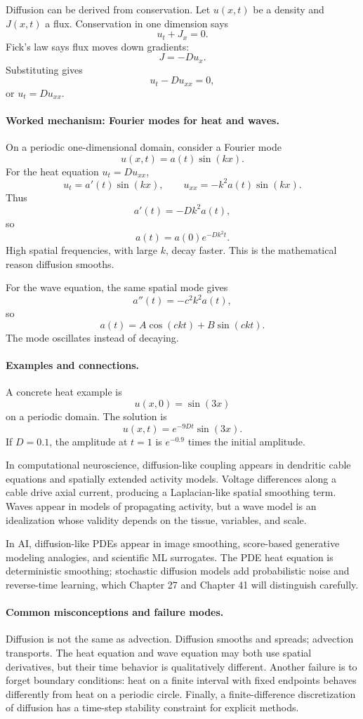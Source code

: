 Diffusion can be derived from conservation. Let \(u(x,t)\) be a density and \(J(x,t)\) a flux. Conservation in one dimension says
\[
u_t+J_x=0.
\]
Fick's law says flux moves down gradients:
\[
J=-D u_x.
\]
Substituting gives
\[
u_t-Du_{xx}=0,
\]
or \(u_t=D u_{xx}\).

\paragraph{Worked mechanism: Fourier modes for heat and waves.}
On a periodic one-dimensional domain, consider a Fourier mode
\[
u(x,t)=a(t)\sin(kx).
\]
For the heat equation \(u_t=D u_{xx}\),
\[
u_t=a'(t)\sin(kx),
\qquad
u_{xx}=-k^2a(t)\sin(kx).
\]
Thus
\[
a'(t)=-Dk^2a(t),
\]
so
\[
a(t)=a(0)e^{-Dk^2t}.
\]
High spatial frequencies, with large \(k\), decay faster. This is the mathematical reason diffusion smooths.

For the wave equation, the same spatial mode gives
\[
a''(t)=-c^2k^2a(t),
\]
so
\[
a(t)=A\cos(ckt)+B\sin(ckt).
\]
The mode oscillates instead of decaying.

\paragraph{Examples and connections.}
A concrete heat example is
\[
u(x,0)=\sin(3x)
\]
on a periodic domain. The solution is
\[
u(x,t)=e^{-9Dt}\sin(3x).
\]
If \(D=0.1\), the amplitude at \(t=1\) is \(e^{-0.9}\) times the initial amplitude.

In computational neuroscience, diffusion-like coupling appears in dendritic cable equations and spatially extended activity models. Voltage differences along a cable drive axial current, producing a Laplacian-like spatial smoothing term. Waves appear in models of propagating activity, but a wave model is an idealization whose validity depends on the tissue, variables, and scale.

In AI, diffusion-like PDEs appear in image smoothing, score-based generative modeling analogies, and scientific ML surrogates. The PDE heat equation is deterministic smoothing; stochastic diffusion models add probabilistic noise and reverse-time learning, which Chapter 27 and Chapter 41 will distinguish carefully.

\paragraph{Common misconceptions and failure modes.}
Diffusion is not the same as advection. Diffusion smooths and spreads; advection transports. The heat equation and wave equation may both use spatial derivatives, but their time behavior is qualitatively different. Another failure is to forget boundary conditions: heat on a finite interval with fixed endpoints behaves differently from heat on a periodic circle. Finally, a finite-difference discretization of diffusion has a time-step stability constraint for explicit methods.

